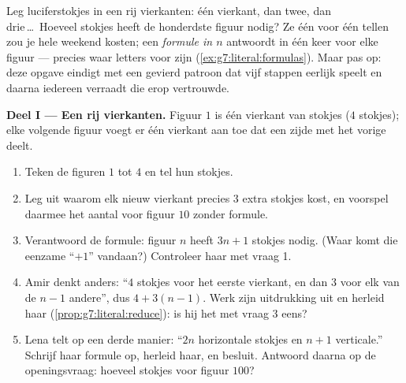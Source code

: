 \begin{problem}
\label{pb:g7:literal:1}
Leg luciferstokjes in een rij vierkanten: één vierkant, dan twee, dan drie\,\dots\
Hoeveel stokjes heeft de honderdste figuur nodig? Ze één voor één tellen zou je
hele weekend kosten; een \emph{formule in $n$} antwoordt in één keer voor elke
figuur --- precies waar letters voor zijn
(\cref{ex:g7:literal:formulas}). Maar pas op: deze opgave eindigt met een
gevierd patroon dat vijf stappen eerlijk speelt en daarna iedereen verraadt die
erop vertrouwde.

\medskip
\noindent\textbf{Deel I --- Een rij vierkanten.}
Figuur $1$ is één vierkant van stokjes ($4$ stokjes); elke volgende figuur voegt
er één vierkant aan toe dat een zijde met het vorige deelt.
\begin{enumerate}
  \item Teken de figuren $1$ tot $4$ en tel hun stokjes.
  \item Leg uit waarom elk nieuw vierkant precies $3$ extra stokjes kost, en
        voorspel daarmee het aantal voor figuur $10$ zonder formule.
  \item Verantwoord de formule: figuur $n$ heeft $3n + 1$ stokjes nodig. (Waar komt
        die eenzame ``$+1$'' vandaan?) Controleer haar met vraag 1.
  \item Amir denkt anders: ``$4$ stokjes voor het eerste vierkant, en dan $3$ voor
        elk van de $n - 1$ andere'', dus $4 + 3(n - 1)$. Werk zijn uitdrukking uit
        en herleid haar (\cref{prop:g7:literal:reduce}): is hij het met vraag 3
        eens?
  \item Lena telt op een derde manier: ``$2n$ horizontale stokjes en $n + 1$
        verticale.'' Schrijf haar formule op, herleid haar, en besluit. Antwoord
        daarna op de openingsvraag: hoeveel stokjes voor figuur $100$?
\end{enumerate}


\end{problem}

